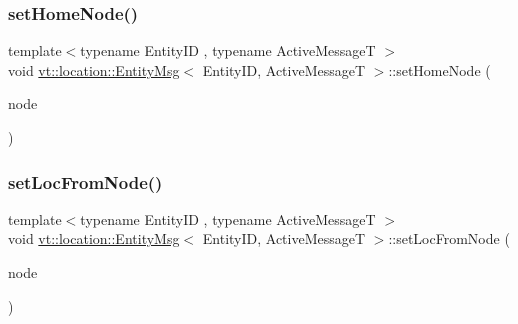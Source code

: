 \mbox{\label{structvt_1_1location_1_1_entity_msg_af2111f7feda34a83a2132d396647f77f}} 
\subsubsection{\texorpdfstring{set\+Home\+Node()}{setHomeNode()}}
{\footnotesize\ttfamily template$<$typename Entity\+ID , typename Active\+MessageT $>$ \\
void \hyperlink{structvt_1_1location_1_1_entity_msg}{vt\+::location\+::\+Entity\+Msg}$<$ Entity\+ID, Active\+MessageT $>$\+::set\+Home\+Node (\begin{DoxyParamCaption}\item[{\hyperlink{namespacevt_a866da9d0efc19c0a1ce79e9e492f47e2}{Node\+Type} const \&}]{node }\end{DoxyParamCaption})\hspace{0.3cm}{\ttfamily [inline]}}

\mbox{\label{structvt_1_1location_1_1_entity_msg_afd28b1e836177cb58d112b25edce1210}} 
\subsubsection{\texorpdfstring{set\+Loc\+From\+Node()}{setLocFromNode()}}
{\footnotesize\ttfamily template$<$typename Entity\+ID , typename Active\+MessageT $>$ \\
void \hyperlink{structvt_1_1location_1_1_entity_msg}{vt\+::location\+::\+Entity\+Msg}$<$ Entity\+ID, Active\+MessageT $>$\+::set\+Loc\+From\+Node (\begin{DoxyParamCaption}\item[{\hyperlink{namespacevt_a866da9d0efc19c0a1ce79e9e492f47e2}{Node\+Type} const \&}]{node }\end{DoxyParamCaption})\hspace{0.3cm}{\ttfamily [inline]}}

\mbox{\label{structvt_1_1location_1_1_entity_msg_a7bbd80a3e29d729cd7be84acb167ff90}} 
